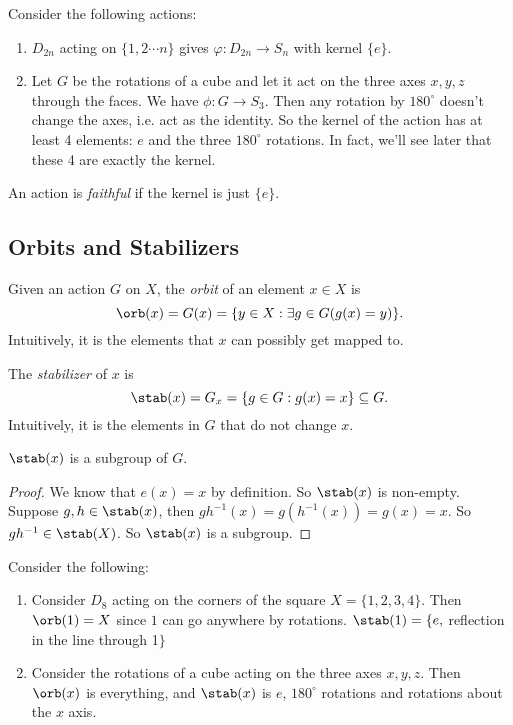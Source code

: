 \documentclass[a4pape]{article}
\begin{document}
\begin{eg}
  Consider the following actions:
  \begin{enumerate}
  \item $D_{2n}$ acting on $\{1, 2\cdots n\}$ gives $\varphi: D_{2n}\to S_n$ with kernel $\{e\}$.
  \item Let $G$ be the rotations of a cube and let it act on the three axes $x, y, z$ through the faces. We have $\phi: G\to S_3$. Then any rotation by $180^\circ$ doesn't change the axes, i.e. act as the identity. So the kernel of the action has at least 4 elements: $e$ and the three $180^\circ$ rotations. In fact, we'll see later that these 4 are exactly the kernel.
  \end{enumerate}
\end{eg}

\begin{defi}
  An action is \emph{faithful} if the kernel is just $\{e\}$.
\end{defi}

\subsection{Orbits and Stabilizers}
\begin{defi}
  Given an action $G$ on $X$, the \emph{orbit} of an element $x\in X$ is 
  \[
  \orb (x) = G(x) = \{y\in X: \exists g\in G(g(x) = y)\}.
  \]
  Intuitively, it is the elements that $x$ can possibly get mapped to.
\end{defi}
\begin{defi}
  The \emph{stabilizer} of $x$ is
  \[
  \stab(x) = G_x = \{g\in G: g(x) = x\}\subseteq G.
  \]
  Intuitively, it is the elements in $G$ that do not change $x$.
\end{defi}

\begin{lemma}
  $\stab(x)$ is a subgroup of $G$.
\end{lemma}

\begin{proof}
  We know that $e(x) = x$ by definition. So $\stab(x)$ is non-empty. Suppose $g, h\in \stab(x)$, then $gh^{-1}(x) = g(h^{-1}(x)) = g(x) = x$. So $gh^{-1}\in \stab (X)$. So $\stab (x)$ is a subgroup.
\end{proof}

\begin{eg}
  Consider the following:
  \begin{enumerate}
  \item Consider $D_8$ acting on the corners of the square $X = \{1, 2, 3, 4\}$. Then $\orb(1) = X$ since $1$ can go anywhere by rotations. $\stab(1) = \{e, $ reflection in the line through 1$\}$
  \item Consider the rotations of a cube acting on the three axes $x, y, z$. Then $\orb(x)$ is everything, and $\stab(x)$ is $e$, $180^\circ$ rotations and rotations about the $x$ axis.
  \end{enumerate}
\end{eg}
\end{document}

